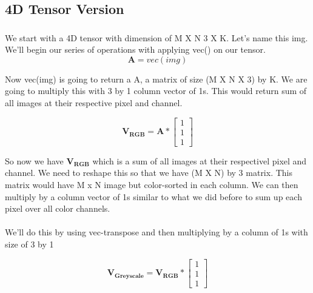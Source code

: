 \documentclass{article}
\newcommand{\matr}[1]{\mathbf{#1}}
\begin{document}
		\subsubsection{} %

	\subsection{4D Tensor Version} %
		\subsubsection{} %
		We start with a 4D tensor with dimension of M X N 3 X K. Let's name this img. 
		We'll begin our series of operations with applying vec() on our tensor.\\

		\begin{equation*}
		\matr{A} = vec(img)
		\end{equation*}

		Now vec(img) is going to return a A, a matrix of size (M X N X 3) by K. We are going to multiply this with 3 by 1 column vector of 1s. 
		This would return sum of all images at their respective pixel and channel.

		\begin{equation*}
		\matr{V_{RGB}} = \matr{A} * 
						\begin{bmatrix} 
						1 \\ 1 \\ 1  
						\end{bmatrix} 
		\end{equation*}	
		
		So now we have $\matr{V_{RGB}}$ which is a sum of all images at their respectivel pixel and channel. We need to reshape this so that
		we have (M X N) by 3 matrix. This matrix would have M x N image but color-sorted in each column.  
		We can then multiply by a column vector of 1s similar to what we did before to sum up each pixel over all color channels. \\
		\\
		We'll do this by using vec-transpose and then multiplying by a column of 1s with size of 3 by 1

		\begin{equation*}
		\matr{V_{Greyscale}} = \matr{V_{RGB}} * 
						\begin{bmatrix} 
						1 \\ 1 \\ 1  
						\end{bmatrix} 
		\end{equation*}	
\end{document}
